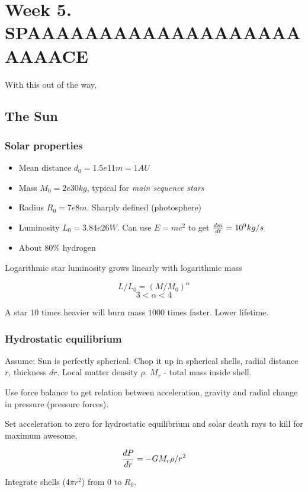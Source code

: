 \documentclass[PlasmaNotes.tex]{subfiles}
\begin{document}
\setcounter{section}{4}

\section{Week 5. SPAAAAAAAAAAAAAAAAAAAAAAACE}

With this out of the way,

\subsection{The Sun}

\subsubsection{Solar properties}
\begin{itemize}
\item Mean distance $d_0 = 1.5e11 m = 1 AU$
\item Mass $M_0=2e30 kg$, typical for \emph{main sequence stars}
\item Radius $R_0 = 7e8 m$. Sharply defined (photosphere)
\item Luminosity $L_0=3.84e26 W$. Can use $E=mc^2$ to get $\frac{d m}{d t} = 10^9 kg/s$ 
\item About 80\% hydrogen
\end{itemize}

Logarithmic star luminosity grows linearly with logarithmic mass

\[ L/L_0 = (M/M_0)^{\alpha} \]
\[ 3 < \alpha < 4\]

A star $10$ times heavier will burn mass $1000$ times faster. Lower lifetime.

\subsubsection{Hydrostatic equilibrium}

Assume: Sun is perfectly spherical. Chop it up in spherical shells, radial distance $r$, thickness $dr$. Local matter density $\rho$. $M_r$ - total mass inside shell.

Use force balance to get relation between acceleration, gravity and radial change in pressure (pressure forces).

Set acceleration to zero for hydrostatic equilibrium and solar death rays to kill for maximum awesome, 

\[ \frac{d P}{d r} = - G M_r \rho /r^2 \]

Integrate shells ($4 \pi r^2$) from $0$ to $R_0$.
\end{document}

